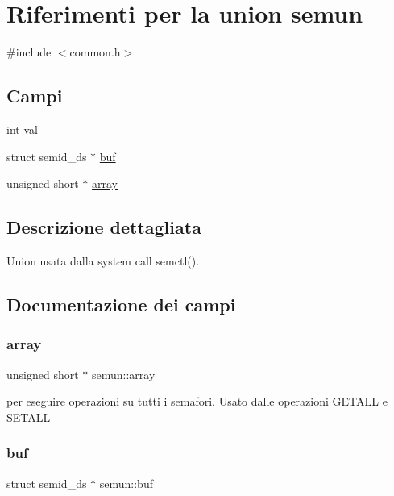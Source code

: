 \hypertarget{unionsemun}{}\section{Riferimenti per la union semun}
\label{unionsemun}


{\ttfamily \#include $<$common.\+h$>$}

\subsection*{Campi}
\begin{DoxyCompactItemize}
\item 
int \hyperlink{unionsemun_ac6121ecb6d04a024e07e12bd71b94031}{val}
\item 
struct semid\+\_\+ds $\ast$ \hyperlink{unionsemun_abe0ba6ad77214cee618027739e992503}{buf}
\item 
unsigned short $\ast$ \hyperlink{unionsemun_a1c74eb9326763d3854dc90167e1f4460}{array}
\end{DoxyCompactItemize}


\subsection{Descrizione dettagliata}
Union usata dalla system call semctl(). 

\subsection{Documentazione dei campi}
\mbox{\label{unionsemun_a1c74eb9326763d3854dc90167e1f4460}} 
\subsubsection{\texorpdfstring{array}{array}}
{\footnotesize\ttfamily unsigned short $\ast$ semun\+::array}

per eseguire operazioni su tutti i semafori. Usato dalle operazioni G\+E\+T\+A\+LL e S\+E\+T\+A\+LL \mbox{\label{unionsemun_abe0ba6ad77214cee618027739e992503}} 
\subsubsection{\texorpdfstring{buf}{buf}}
{\footnotesize\ttfamily struct semid\+\_\+ds $\ast$ semun\+::buf}

